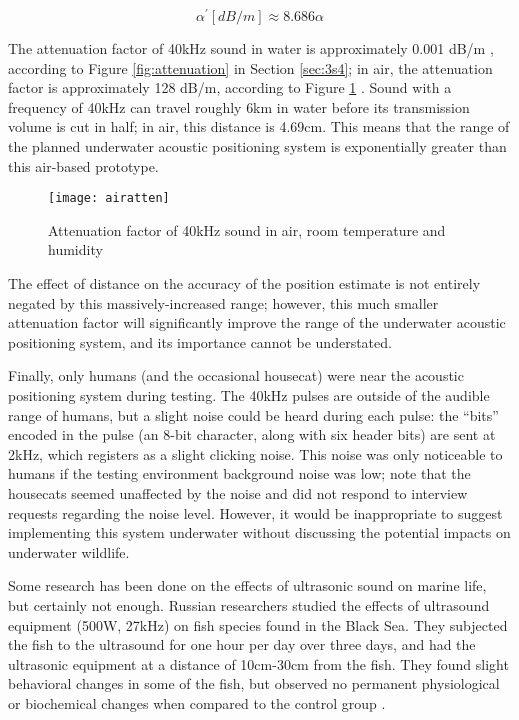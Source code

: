 \documentclass[11pt]{ucthesisCP}
\begin{document}
\begin{equation} \label{eq:6eq3}
	\alpha^{'} [dB/m] \approx 8.686 \alpha
\end{equation}

The attenuation factor of 40kHz sound in water is approximately 0.001 dB/m \cite{computational}, according to Figure \ref{fig:attenuation} in Section \ref{sec:3s4}; in air, the attenuation factor is approximately 128 dB/m, according to Figure \ref{fig:airatten} \cite{airatten}. Sound with a frequency of 40kHz can travel roughly 6km in water before its transmission volume is cut in half; in air, this distance is 4.69cm. This means that the range of the planned underwater acoustic positioning system is exponentially greater than this air-based prototype. 

\begin{figure}[htbp]
	\centering
	\texttt{[image: airatten]}
	\caption{Attenuation factor of 40kHz sound in air, room temperature and humidity \cite{airatten}}
	\label{fig:airatten}
\end{figure}

The effect of distance on the accuracy of the position estimate is not entirely negated by this massively-increased range; however, this much smaller attenuation factor will significantly improve the range of the underwater acoustic positioning system, and its importance cannot be understated.

Finally, only humans (and the occasional housecat) were near the acoustic positioning system during testing. The 40kHz pulses are outside of the audible range of humans, but a slight noise could be heard during each pulse: the “bits” encoded in the pulse (an 8-bit character, along with six header bits) are sent at 2kHz, which registers as a slight clicking noise. This noise was only noticeable to humans if the testing environment background noise was low; note that the housecats seemed unaffected by the noise and did not respond to interview requests regarding the noise level. However, it would be inappropriate to suggest implementing this system underwater without discussing the potential impacts on underwater wildlife.

Some research has been done on the effects of ultrasonic sound on marine life, but certainly not enough. Russian researchers studied the effects of ultrasound equipment (500W, 27kHz) on fish species found in the Black Sea. They subjected the fish to the ultrasound for one hour per day over three days, and had the ultrasonic equipment at a distance of 10cm-30cm from the fish. They found slight behavioral changes in some of the fish, but observed no permanent physiological or biochemical changes when compared to the control group \cite{blacksea}.
\end{document}
